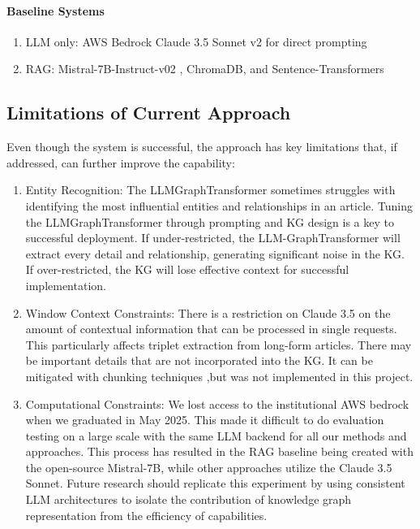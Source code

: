 \documentclass[11pt]{article}
\begin{document}
\paragraph{Baseline Systems}
\begin{enumerate}
    \item LLM only:  AWS Bedrock Claude 3.5 Sonnet v2 for direct prompting

    \item  RAG: Mistral-7B-Instruct-v02 \cite{r34}, ChromaDB, and Sentence-Transformers


\end{enumerate}

\subsection{Limitations of Current Approach}
Even though the system is successful, the approach has key limitations that, if addressed, can further improve the capability:

\begin{enumerate}
    \item Entity Recognition: The LLMGraphTransformer sometimes struggles with identifying the most influential entities and relationships in an article. Tuning the LLMGraphTransformer through prompting and KG design is a key to successful deployment. If under-restricted, the LLM-GraphTransformer will extract every detail and relationship, generating significant noise in the KG. If over-restricted, the KG will lose effective context for successful implementation.

    \item Window Context Constraints: There is a restriction on Claude 3.5 on the amount of contextual information that can be processed in single requests. This particularly affects triplet extraction from long-form articles. There may be important details that are not incorporated into the KG. It can be mitigated with chunking techniques ,but was not implemented in this project.

\item Computational Constraints: We lost access to the institutional AWS bedrock when we graduated in May 2025. This made it difficult to do evaluation testing on a large scale with the same LLM backend for all our methods and approaches. This process has resulted in the RAG baseline being created with the open-source Mistral-7B, while other approaches utilize the Claude 3.5 Sonnet. Future research should replicate this experiment by using consistent LLM architectures to isolate the contribution of knowledge graph representation from the efficiency of capabilities. 




\end{enumerate}
\end{document}
